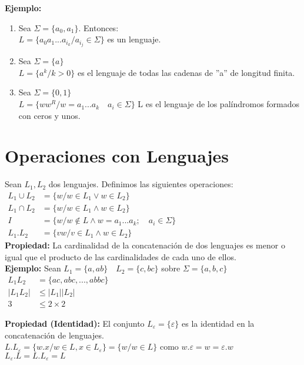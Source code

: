 \textbf{Ejemplo: }
\begin{enumerate}
\item Sea $\Sigma = \lbrace a_0,a_1\rbrace$. Entonces:\\
	$L=\lbrace a_0 a_1...a_{i_k} / a_{i_j} \in \Sigma \rbrace$ es un lenguaje.

\item Sea $\Sigma = \lbrace a\rbrace$\\
	$L=\lbrace a^k / k>0 \rbrace$ es el lenguaje de todas las cadenas de ''a'' de longitud finita.

\item Sea $\Sigma=\lbrace 0,1\rbrace$\\
	$L=\lbrace ww^R/w=a_1...a_k \quad a_i \in \Sigma\rbrace$ L es el lenguaje de los palíndromos formados con ceros y unos.
\end{enumerate}

\section{Operaciones con Lenguajes}
Sean $L_1, L_2$ dos lenguajes. Definimos las siguientes operaciones:\\

$\begin{array}{rl}L_1\cup L_2 &=\lbrace w/w \in L_1 \lor w \in L_2\rbrace\\
L_1\cap L_2 &= \lbrace w/w\in L_1 \land w\in L_2\rbrace\\
I &=\lbrace w/w \not \in L \land w=a_1...a_k; \quad a_i\in \Sigma\rbrace\\
L_1.L_2 &=\lbrace vw/v\in L_1 \land w\in L_2\rbrace
\end{array}$\\

\textbf{Propiedad: }La cardinalidad de la concatenación de dos lenguajes es menor o igual que el producto de las cardinalidades de cada uno de ellos.\\

\textbf{Ejemplo: }Sean $L_1=\lbrace a,ab\rbrace \quad L_2=\lbrace c,bc\rbrace$ sobre $\Sigma =\lbrace a,b,c\rbrace$\\
$\begin{array}{rl}L_1 L_2 &=\lbrace ac,abc,...,abbc\rbrace\\
|L_1 L_2| &\leq |L_1||L_2|\\
3 &\leq 2\times 2
\end{array}$

\textbf{Propiedad (Identidad): }El conjunto $L_\varepsilon =\lbrace \varepsilon \rbrace$ es la identidad en la concatenación de lenguajes.\\
$L.L_\varepsilon =\lbrace w.x/w\in L,x\in L_\varepsilon \rbrace = \lbrace w/w\in L\rbrace$ como $w.\varepsilon = w= \varepsilon . w$\\
$L_\varepsilon .L= L.L_\varepsilon = L$\\ %

